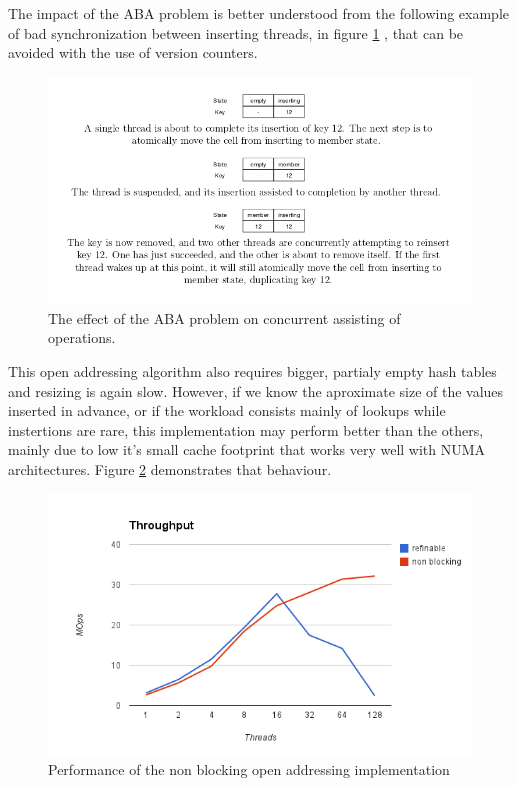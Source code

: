 The impact of the ABA problem is better understood from the following example of bad synchronization between inserting threads, in figure \ref{non_blocking_3} , that can be avoided with the use of version counters.

\begin{figure}
 \centering
  \includegraphics[scale=0.5]{non_blocking_3.png}
\caption{The effect of the ABA problem on concurrent assisting of operations.}
\label{non_blocking_3}
\end{figure}

This open addressing algorithm also requires bigger, partialy empty hash tables and resizing is again slow. However, if we know the aproximate size of the values inserted in advance, or if the workload consists mainly of lookups while instertions are rare, this implementation may perform better than the others,  mainly due to low it's small cache footprint that works very well with NUMA architectures. Figure \ref{hashes_non_blocking_perf} demonstrates that behaviour.

\begin{figure}
 \centering
  \includegraphics[scale=0.5]{hashes_non_blocking_perf.png}
\caption{Performance of the non blocking open addressing implementation}
\label{hashes_non_blocking_perf}
\end{figure}
